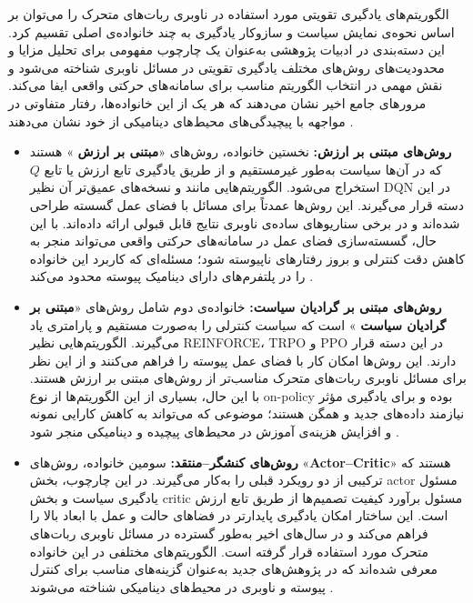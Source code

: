 الگوریتم‌های یادگیری تقویتی مورد استفاده در ناوبری ربات‌های متحرک را می‌توان بر اساس نحوه‌ی نمایش سیاست و سازوکار یادگیری به چند خانواده‌ی اصلی تقسیم کرد. این دسته‌بندی در ادبیات پژوهشی به‌عنوان یک چارچوب مفهومی برای تحلیل مزایا و محدودیت‌های روش‌های مختلف  یادگیری تقویتی در مسائل ناوبری شناخته می‌شود و نقش مهمی در انتخاب الگوریتم مناسب برای سامانه‌های حرکتی واقعی ایفا می‌کند. مرورهای جامع اخیر نشان می‌دهند که هر یک از این خانواده‌ها، رفتار متفاوتی در مواجهه با پیچیدگی‌های محیط‌های دینامیکی از خود نشان می‌دهند%
\cite{Alsolami2025AutonomousNavigationSurvey,Le2024DRLNavigationSurvey}.
\begin{itemize}
\item{\textbf{روش‌های مبتنی بر ارزش:}}
نخستین خانواده، روش‌های «\textbf{مبتنی بر ارزش}%
» هستند که در آن‌ها سیاست به‌طور غیرمستقیم و از طریق یادگیری تابع ارزش یا تابع $Q$ استخراج می‌شود. الگوریتم‌هایی مانند 
 و نسخه‌های عمیق‌تر آن نظیر DQN در این دسته قرار می‌گیرند. این روش‌ها عمدتاً برای مسائل با فضای عمل گسسته طراحی شده‌اند و در برخی سناریوهای ساده‌ی ناوبری نتایج قابل قبولی ارائه داده‌اند. با این حال، گسسته‌سازی فضای عمل در سامانه‌های حرکتی واقعی می‌تواند منجر به کاهش دقت کنترلی و بروز رفتارهای ناپیوسته شود؛ مسئله‌ای که کاربرد این خانواده را در پلتفرم‌های دارای دینامیک پیوسته محدود می‌کند%
\cite{Alsolami2025AutonomousNavigationSurvey}.

\item{\textbf{روش‌های مبتنی بر گرادیان سیاست:}}
خانواده‌ی دوم شامل روش‌های «\textbf{مبتنی بر گرادیان سیاست}%
» است که سیاست کنترلی را به‌صورت مستقیم و پارامتری یاد می‌گیرند. الگوریتم‌هایی نظیر REINFORCE، TRPO و PPO در این دسته قرار دارند. این روش‌ها امکان کار با فضای عمل پیوسته را فراهم می‌کنند و از این نظر برای مسائل ناوبری ربات‌های متحرک مناسب‌تر از روش‌های مبتنی بر ارزش هستند. با این حال، بسیاری از این الگوریتم‌ها از نوع on-policy بوده و برای یادگیری مؤثر نیازمند داده‌های جدید و همگن هستند؛ موضوعی که می‌تواند به کاهش کارایی نمونه و افزایش هزینه‌ی آموزش در محیط‌های پیچیده و دینامیکی منجر شود%
\cite{Kober2013RLRobotics,Le2024DRLNavigationSurvey}.

\item{\textbf{روش‌های کنشگر--منتقد:}}
سومین خانواده، روش‌های «\textbf{Actor--Critic}» هستند که ترکیبی از دو رویکرد قبلی را به‌کار می‌گیرند. در این چارچوب، بخش actor مسئول یادگیری سیاست و بخش critic مسئول برآورد کیفیت تصمیم‌ها از طریق تابع ارزش است. این ساختار امکان یادگیری پایدارتر در فضاهای حالت و عمل با ابعاد بالا را فراهم می‌کند و در سال‌های اخیر به‌طور گسترده در مسائل ناوبری ربات‌های متحرک مورد استفاده قرار گرفته است. الگوریتم‌های مختلفی در این خانواده معرفی شده‌اند که در پژوهش‌های جدید به‌عنوان گزینه‌های مناسب برای کنترل پیوسته و ناوبری در محیط‌های دینامیکی شناخته می‌شوند%
\cite{Alsolami2025AutonomousNavigationSurvey,Le2024DRLNavigationSurvey}.


\end{itemize}
